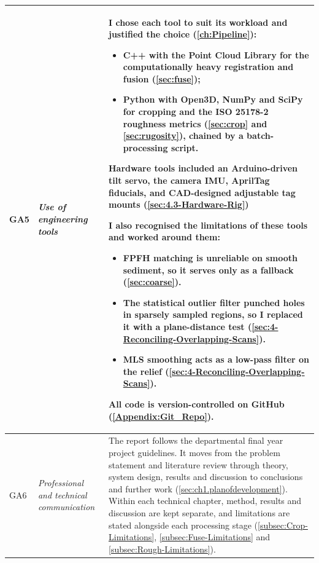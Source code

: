 {\begin{longtable}{>{\raggedright\arraybackslash}p{} >{\raggedright\arraybackslash}p{} >{\noindent\justifying\arraybackslash}p{}}
		GA5 & \textit{Use of engineering tools} &
		I chose each tool to suit its workload and justified the choice (\autoref{ch:Pipeline}):
		\begin{itemize}
			\item C++ with the Point Cloud Library for the computationally heavy registration and fusion (\autoref{sec:fuse});
			\item Python with Open3D, NumPy and SciPy for cropping and the ISO 25178-2 roughness metrics (\autoref{sec:crop} and \autoref{sec:rugosity}), chained by a batch-processing script.
		\end{itemize}
		Hardware tools included an Arduino-driven tilt servo, the camera IMU, AprilTag fiducials, and CAD-designed adjustable tag mounts (\autoref{sec:4.3-Hardware-Rig})
		
		I also recognised the limitations of these tools and worked around them:
		\begin{itemize}
			\item FPFH matching is unreliable on smooth sediment, so it serves only as a fallback (\autoref{sec:coarse}).
			
			\item The statistical outlier filter punched holes in sparsely sampled regions, so I replaced it with a plane-distance test (\autoref{sec:4-Reconciling-Overlapping-Scans}).
			\item MLS smoothing acts as a low-pass filter on the relief (\autoref{sec:4-Reconciling-Overlapping-Scans}).
		\end{itemize}
		All code is version-controlled on GitHub (\autoref{Appendix:Git_Repo}). \\
		\cmidrule(lr){1-3}
		
		GA6 & \textit{Professional and technical communication} &
		The report follows the departmental final year project guidelines. It moves from the problem statement and literature review through theory, system design, results and discussion to conclusions and further work (\autoref{sec:ch1.planofdevelopment}). Within each technical chapter, method, results and discussion are kept separate, and limitations are stated alongside each processing stage (\autoref{subsec:Crop-Limitations}, \autoref{subsec:Fuse-Limitations} and \autoref{subsec:Rough-Limitations}).
		

\end{longtable}}
